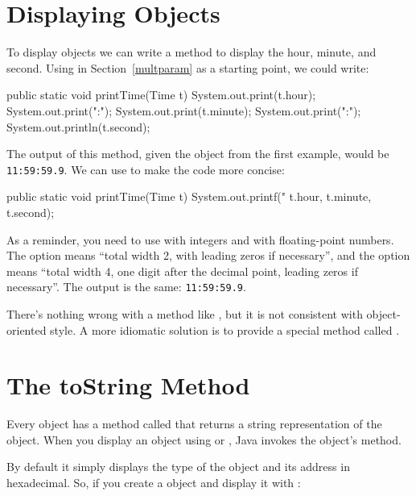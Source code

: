 \section{Displaying Objects}

To display  objects we can write a method to display the hour, minute, and second.
Using  in Section~\ref{multparam} as a starting point, we could write:

\begin{code}
public static void printTime(Time t) {
    System.out.print(t.hour);
    System.out.print(":");
    System.out.print(t.minute);
    System.out.print(":");
    System.out.println(t.second);
}
\end{code}

The output of this method, given the  object from the first example, would be {\tt 11:59:59.9}.
We can use  to make the code more concise:


\begin{code}
public static void printTime(Time t) {
    System.out.printf("%
        t.hour, t.minute, t.second);
}
\end{code}

As a reminder, you need to use  with integers and  with floating-point numbers.
The  option means ``total width 2, with leading zeros if necessary'', and the  option means ``total width 4, one digit after the decimal point, leading zeros if necessary''.
The output is the same: {\tt 11:59:59.9}.

There's nothing wrong with a method like , but it is not consistent with object-oriented style.
A more idiomatic solution is to provide a special method called .


\section{The toString Method}

Every object has a method called  that returns a string representation of the object.
When you display an object using  or , Java invokes the object's  method.


By default it simply displays the type of the object and its address in hexadecimal. 
So, if you create a  object and display it with :

